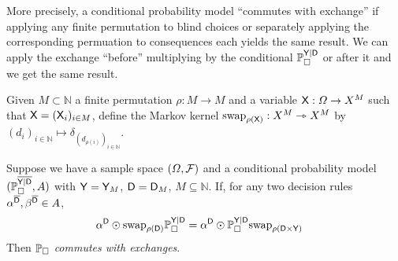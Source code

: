 


More precisely, a conditional probability model ``commutes with exchange'' if applying any finite permutation to blind choices or separately applying the corresponding permuation to consequences each yields the same result. We can apply the exchange ``before'' multiplying by the conditional $\mathbb{P}_{\square}^{\mathsf{Y}|\mathsf{D}}$ or after it and we get the same result.

\begin{definition}
Given $M\subset \mathbb{N}$ a finite permutation $\rho:M\to M$ and a variable $\mathsf{X}:\Omega\to X^M$ such that $\mathsf{X}=(\mathsf{X}_i)_{i\in M}$, define the Markov kernel $\text{swap}_{\rho(\mathsf{X})}:X^M\rightarrowtriangle X^M$ by $(d_i)_{i\in\mathbb{N}}\mapsto \delta_{(d_{\rho(i)})_{i\in\mathbb{N}}}$.
\end{definition}

\begin{definition}\label{def:caus_exch}
Suppose we have a sample space $(\Omega,\mathcal{F})$ and a conditional probability model $(\mathbb{P}_{\square}^{\overline{\mathsf{Y}|\mathsf{D}}},A)$ with $\mathsf{Y}=\mathsf{Y}_M$, $\mathsf{D}=\mathsf{D}_M$, $M\subseteq \mathbb{N}$. If, for any two decision rules $\alpha^{\overline{\mathsf{D}}},\beta^{\overline{\mathsf{D}}} \in A$,
\begin{align}
    \alpha^{\mathsf{D}}\odot \text{swap}_{\rho(\mathsf{D})} \mathbb{P}_{\square}^{\mathsf{Y}|\mathsf{D}} &= \alpha^{\mathsf{D}}\odot \mathbb{P}_{\square}^{\mathsf{Y}|\mathsf{D}}\text{swap}_{\rho(\mathsf{D}\times \mathsf{Y})}
\end{align}
Then $\mathbb{P}_\square$ \emph{commutes with exchanges}.
\end{definition}

